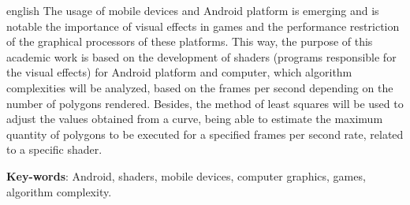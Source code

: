 \begin{resumo}[Abstract]
 \begin{otherlanguage*}{english}
  	The usage of mobile devices and Android platform is emerging and is notable the importance of visual effects in games and the performance restriction of the graphical processors of these platforms. This way, the purpose of this academic work is based on the development of shaders (programs responsible for the visual effects) for Android platform and computer, which algorithm complexities will be analyzed, based on the frames per second depending on the number of polygons rendered. Besides, the method of least squares will be used to adjust the values obtained from a curve, being able to estimate the maximum quantity of polygons to be executed for a specified frames per second rate, related to a specific shader.  

   \vspace{\onelineskip}
 
   \noindent 
   \textbf{Key-words}: Android, shaders, mobile devices, computer graphics, games, algorithm complexity. 
 \end{otherlanguage*}
\end{resumo}
